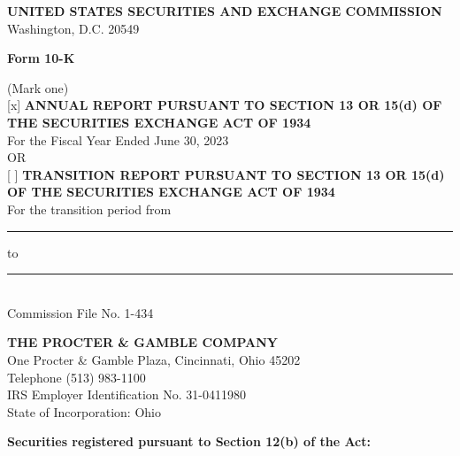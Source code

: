 \documentclass{article}
\begin{document}
\begin{center}
    \textbf{UNITED STATES SECURITIES AND EXCHANGE COMMISSION} \\
    Washington, D.C. 20549

    \vspace{1em}
    \Large \textbf{Form 10-K}
\end{center}

\vspace{1em}

(Mark one) \\
\textnormal{[x]} \textbf{ANNUAL REPORT PURSUANT TO SECTION 13 OR 15(d) OF THE SECURITIES EXCHANGE ACT OF 1934}\\
\hspace*{2em}For the Fiscal Year Ended June 30, 2023 \\
OR \\
\textnormal{[ ]} \textbf{TRANSITION REPORT PURSUANT TO SECTION 13 OR 15(d) OF THE SECURITIES EXCHANGE ACT OF 1934} \\
\hspace*{2em}For the transition period from \rule{3cm}{0.4pt} to \rule{3cm}{0.4pt} \\

\vspace{1em}
Commission File No. 1-434

\vspace{1em}
\begin{center}
    \textbf{THE PROCTER \& GAMBLE COMPANY} \\
    One Procter \& Gamble Plaza, Cincinnati, Ohio 45202 \\
    Telephone (513) 983-1100 \\
    IRS Employer Identification No. 31-0411980 \\
    State of Incorporation: Ohio
\end{center}

\vspace{1em}
\noindent\textbf{Securities registered pursuant to Section 12(b) of the Act:}
\end{document}
